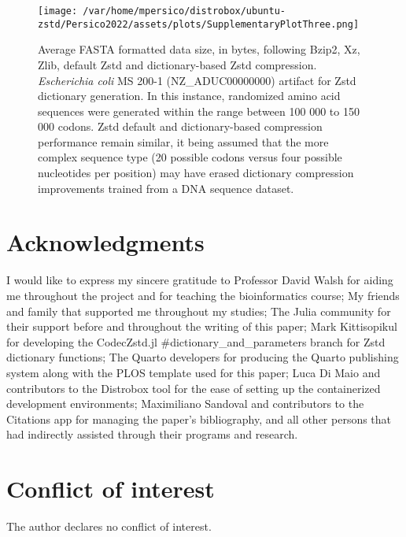 \documentclass[
  10pt,
  letterpaper,
]{article}
\begin{document}
\begin{figure}

{\centering \texttt{[image: /var/home/mpersico/distrobox/ubuntu-zstd/Persico2022/assets/plots/SupplementaryPlotThree.png]}

}

\caption{\label{fig-rna}Average FASTA formatted data size, in bytes,
following Bzip2, Xz, Zlib, default Zstd and dictionary-based Zstd
compression. \emph{Escherichia coli} MS 200-1 (NZ\_ADUC00000000)
artifact for Zstd dictionary generation. In this instance, randomized
amino acid sequences were generated within the range between 100 000 to
150 000 codons. Zstd default and dictionary-based compression
performance remain similar, it being assumed that the more complex
sequence type (20 possible codons versus four possible nucleotides per
position) may have erased dictionary compression improvements trained
from a DNA sequence dataset.}

\end{figure}

\newpage

\hypertarget{acknowledgments}{%
\section{Acknowledgments}\label{acknowledgments}}

I would like to express my sincere gratitude to Professor David Walsh
for aiding me throughout the project and for teaching the bioinformatics
course; My friends and family that supported me throughout my studies;
The Julia community for their support before and throughout the writing
of this paper; Mark Kittisopikul for developing the CodecZstd.jl
\#dictionary\_and\_parameters branch for Zstd dictionary functions; The
Quarto developers for producing the Quarto publishing
system\citep{Allaire_Quarto_2022} along with the PLOS template used for
this paper; Luca Di Maio and contributors to the Distrobox tool for the
ease of setting up the containerized development
environments\citep{maio}; Maximiliano Sandoval and contributors to the
Citations app for managing the paper's bibliography\citep{sandoval}, and
all other persons that had indirectly assisted through their programs
and research.

\hypertarget{conflict-of-interest}{%
\section{Conflict of interest}\label{conflict-of-interest}}

The author declares no conflict of interest.


\nolinenumbers
  
\end{document}
